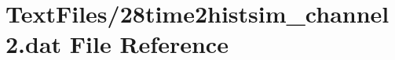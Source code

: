 \hypertarget{28time2histsim__channel2_8dat}{}\section{Text\+Files/28time2histsim\+\_\+channel2.dat File Reference}
\label{28time2histsim__channel2_8dat}
